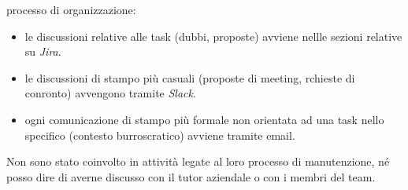 processo di organizzazione:
\begin{itemize}
    \item le discussioni relative alle task (dubbi, proposte) avviene nellle sezioni relative su \emph{Jira}.
    \item le discussioni di stampo più casuali (proposte di meeting, rchieste di conronto) avvengono tramite \emph{Slack}.
    \item ogni comunicazione di stampo più formale non orientata ad una task nello specifico (contesto burroscratico) avviene tramite email.
\end{itemize}

Non sono stato coinvolto in attività legate al loro processo di manutenzione, né posso dire di averne discusso con il tutor aziendale o con i membri del team.